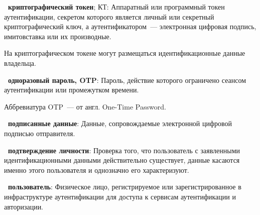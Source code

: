 {\bf \thedefctr~криптографический токен}; КТ:
Аппаратный или программный токен аутентификации, секретом которого 
является личный или секретный криптографический ключ, а аутентификатором~---  
электронная цифровая подпись, имитовставка или их производные. 

\begin{note*}
На криптографическом токене могут размещаться идентификационные данные 
владельца.
\end{note*}

{\bf \thedefctr~одноразовый пароль, OTP}: %
Пароль, действие которого ограничено сеансом аутентификации или промежутком 
времени.

\begin{note*}
Аббревиатура OTP~--- от англ. One-Time Password.
\end{note*}

{\bf \thedefctr~подписанные данные}: %
Данные, сопровождаемые электронной цифровой подписью отправителя. 

{\bf \thedefctr~подтверждение личности}:
Проверка того, что пользователь с заявленными идентификационными данными
действительно существует, данные касаются именно этого пользователя и однозначно
его характеризуют.


%





{\bf \thedefctr~пользователь}:
Физическое лицо, регистрируемое или зарегистрированное в инфраструктуре 
аутентификации для доступа к сервисам аутентификации и авторизации.
                
